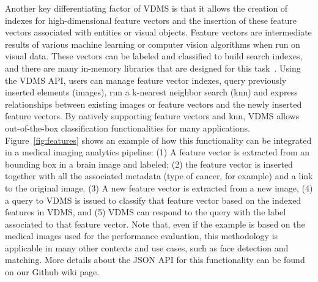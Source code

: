 Another key differentiating factor of VDMS is that it allows the creation of
indexes for high-dimensional feature vectors and the insertion of
these feature vectors associated with entities or visual objects.
Feature vectors are intermediate results of various machine
learning or computer vision algorithms when run on visual data.
These vectors can be labeled and classified to build search indexes,
and there are many in-memory libraries that are designed for
this task~\cite{flann, faiss}.
Using the VDMS API, users can manage feature vector indexes,
query previously inserted elements (images),
run a k-nearest neighbor search (knn) and express relationships
between existing images or feature vectors and
the newly inserted feature vectors.
By natively supporting feature vectors and knn,
VDMS allows out-of-the-box classification
functionalities for many applications.
Figure~\ref{fig:features} shows an example of how this functionality
can be integrated in a medical imaging analytics pipeline:
(1) A feature vector is extracted from an bounding
box in a brain image and labeled;
(2) the feature vector is inserted together
with all the associated metadata (type of cancer, for example)
and a link to the original image.
(3) A new feature vector is extracted from a new image,
(4) a query to VDMS is issued to classify that feature vector based on the
indexed features in VDMS, and
(5) VDMS can respond to the query with the label
associated to that feature vector.
Note that, even if the example is based on the medical images used for the
performance evaluation, this methodology is applicable in many other contexts
and use cases, such as face detection and matching.
More details about the JSON API for this functionality can be found on
our Github wiki page.
